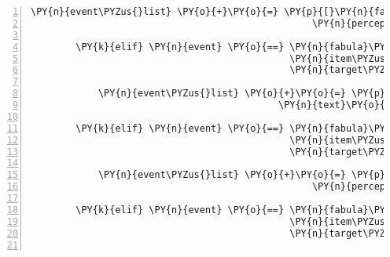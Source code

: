 \begin{Verbatim}[commandchars=\\\{\},numbers=left,firstnumber=1,stepnumber=1]
            \PY{n}{event\PYZus{}list} \PY{o}{+}\PY{o}{=} \PY{p}{[}\PY{n}{fabula}\PY{o}{.}\PY{n}{PerceptionEvent}\PY{p}{(}\PY{n}{identifier}\PY{o}{=}\PY{n}{ID\PYZus{}KUNI}\PY{p}{,}
                                                  \PY{n}{perception}\PY{o}{=}\PY{l+s}{\PYZsq{}}\PY{l+s}{Was fang ich damit nur an?}\PY{l+s}{\PYZsq{}}\PY{p}{)}\PY{p}{]}

        \PY{k}{elif} \PY{n}{event} \PY{o}{==} \PY{n}{fabula}\PY{o}{.}\PY{n}{TriesToDropEvent}\PY{p}{(}\PY{n}{identifier}\PY{o}{=}\PY{n}{ID\PYZus{}KUNI}\PY{p}{,}
                                              \PY{n}{item\PYZus{}identifier}\PY{o}{=}\PY{l+s}{\PYZsq{}}\PY{l+s}{string\PYZus{}harp}\PY{l+s}{\PYZsq{}}\PY{p}{,}
                                              \PY{n}{target\PYZus{}identifier}\PY{o}{=}\PY{l+s}{\PYZsq{}}\PY{l+s}{guardian}\PY{l+s}{\PYZsq{}}\PY{p}{)}\PY{p}{:}

            \PY{n}{event\PYZus{}list} \PY{o}{+}\PY{o}{=} \PY{p}{[}\PY{n}{fabula}\PY{o}{.}\PY{n}{SaysEvent}\PY{p}{(}\PY{n}{identifier}\PY{o}{=}\PY{l+s}{\PYZsq{}}\PY{l+s}{guardian}\PY{l+s}{\PYZsq{}}\PY{p}{,}
                                            \PY{n}{text}\PY{o}{=}\PY{l+s}{\PYZsq{}}\PY{l+s}{Was soll ich mit einer Saite ohne Klangkörper?}\PY{l+s}{\PYZsq{}}\PY{p}{)}\PY{p}{]}

        \PY{k}{elif} \PY{n}{event} \PY{o}{==} \PY{n}{fabula}\PY{o}{.}\PY{n}{TriesToDropEvent}\PY{p}{(}\PY{n}{identifier}\PY{o}{=}\PY{n}{ID\PYZus{}CASSANDRA}\PY{p}{,}
                                              \PY{n}{item\PYZus{}identifier}\PY{o}{=}\PY{l+s}{\PYZsq{}}\PY{l+s}{lute\PYZus{}broken}\PY{l+s}{\PYZsq{}}\PY{p}{,}
                                              \PY{n}{target\PYZus{}identifier}\PY{o}{=}\PY{n}{ID\PYZus{}CASSANDRA}\PY{p}{)}\PY{p}{:}

            \PY{n}{event\PYZus{}list} \PY{o}{+}\PY{o}{=} \PY{p}{[}\PY{n}{fabula}\PY{o}{.}\PY{n}{PerceptionEvent}\PY{p}{(}\PY{n}{identifier}\PY{o}{=}\PY{n}{ID\PYZus{}CASSANDRA}\PY{p}{,}
                                                  \PY{n}{perception}\PY{o}{=}\PY{l+s}{\PYZsq{}}\PY{l+s}{Was fang ich damit nur an?}\PY{l+s}{\PYZsq{}}\PY{p}{)}\PY{p}{]}

        \PY{k}{elif} \PY{n}{event} \PY{o}{==} \PY{n}{fabula}\PY{o}{.}\PY{n}{TriesToDropEvent}\PY{p}{(}\PY{n}{identifier}\PY{o}{=}\PY{n}{ID\PYZus{}CASSANDRA}\PY{p}{,}
                                              \PY{n}{item\PYZus{}identifier}\PY{o}{=}\PY{l+s}{\PYZsq{}}\PY{l+s}{lute\PYZus{}broken}\PY{l+s}{\PYZsq{}}\PY{p}{,}
                                              \PY{n}{target\PYZus{}identifier}\PY{o}{=}\PY{l+s}{\PYZsq{}}\PY{l+s}{guardian}\PY{l+s}{\PYZsq{}}\PY{p}{)}\PY{p}{:}


\end{Verbatim}
